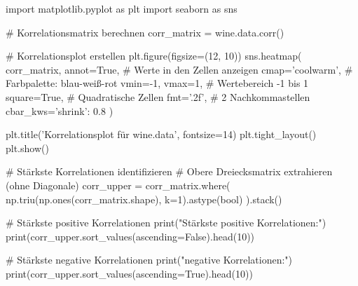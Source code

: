import matplotlib.pyplot as plt
import seaborn as sns

# Korrelationsmatrix berechnen
corr_matrix = wine.data.corr()

# Korrelationsplot erstellen
plt.figure(figsize=(12, 10))
sns.heatmap(
    corr_matrix,
    annot=True,           # Werte in den Zellen anzeigen
    cmap='coolwarm',      # Farbpalette: blau-weiß-rot
    vmin=-1, vmax=1,      # Wertebereich -1 bis 1
    square=True,          # Quadratische Zellen
    fmt='.2f',            # 2 Nachkommastellen
    cbar_kws={'shrink': 0.8}
)

plt.title('Korrelationsplot für wine.data', fontsize=14)
plt.tight_layout()
plt.show()

# Stärkste Korrelationen identifizieren
# Obere Dreiecksmatrix extrahieren (ohne Diagonale)
corr_upper = corr_matrix.where(
    np.triu(np.ones(corr_matrix.shape), k=1).astype(bool)
).stack()

# Stärkste positive Korrelationen
print("Stärkste positive Korrelationen:")
print(corr_upper.sort_values(ascending=False).head(10))

# Stärkste negative Korrelationen
print(" negative Korrelationen:")
print(corr_upper.sort_values(ascending=True).head(10))